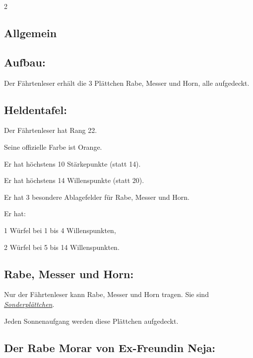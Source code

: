 \documentclass[10pt, a4paper, oneside]{book}
\newcommand{\fan}[1]{\textit{#1}}
\begin{document}
\begin{multicols*}{2}\raggedcolumns


\begin{nobgcolor}

\section{Allgemein}


\subsection{Aufbau:}

Der Fährtenleser erhält die 3 Plättchen Rabe, Messer und Horn, alle aufgedeckt.



\subsection{Heldentafel:}

Der Fährtenleser hat Rang 22.

Seine offizielle Farbe ist Orange.

Er hat höchstens 10 Stärkepunkte (statt 14).

Er hat höchstens 14 Willenspunkte (statt 20).

Er hat 3 besondere Ablagefelder für Rabe, Messer und Horn.

Er hat:

\bullet{} 1 Würfel bei 1 bis 4 Willenspunkten,

\bullet{} 2 Würfel bei 5 bis 14 Willenspunkten.



\subsection{Rabe, Messer und Horn:}

Nur der Fährtenleser kann Rabe, Messer und Horn tragen. Sie sind \hyperref[Gegenstände und Sonderplättchen]{\fan{Sonderplättchen}}.
\supercite{6952}

Jeden Sonnenaufgang werden diese Plättchen aufgedeckt.
\supercite{NH:Begleitheft}







\subsection{Der Rabe Morar von Ex-Freundin Neja:}


\end{nobgcolor}
\end{multicols*}
\end{document}
